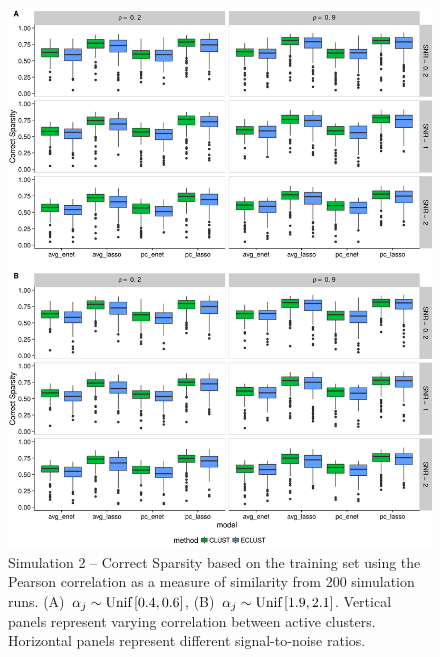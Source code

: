 \begin{appendices}
\begin{figure}[H]
	\centering
	\includegraphics[scale=0.55, keepaspectratio]{./figs/hydra/results/figures/sim2-sept8/CorrectSparsity_Correlation_sim2.png}
	\caption{Simulation 2 -- Correct Sparsity based on the training set using the Pearson correlation as a measure of similarity from 200 simulation runs. \mbox{(A) $\alpha_{j} \sim \textrm{{Unif}}\left[0.4, 0.6\right]$}, \mbox{(B) $\alpha_{j} \sim \textrm{{Unif}}\left[1.9, 2.1\right]$}. Vertical panels represent varying correlation between active clusters. Horizontal panels represent different signal-to-noise ratios.}
	\label{fig:CorrectSparsity_Correlation_sim2}
\end{figure}



\end{appendices}
